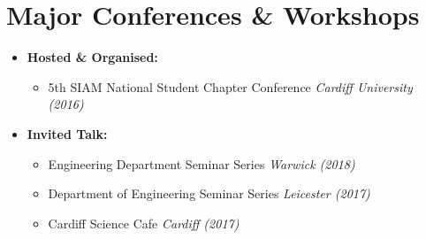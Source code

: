 \documentclass[10pt,a4paper,sans]{moderncv}        %
\begin{document}
	\vspace{10pt}
	
	\section{Major Conferences \& Workshops}
	
	\vspace{8pt}
	
	\begin{itemize}
		
		\item{\textbf{Hosted \& Organised:} 
			\small{
				\begin{itemize}
					\vspace{3pt}
					\item 5th SIAM National Student Chapter Conference \hfill \textit{Cardiff University (2016)}
		\end{itemize}}}
		
		\vspace{6pt}
		
		\item{\textbf{Invited Talk:}
			
			\small{
				\begin{itemize}
					\vspace{3pt}
					\item Engineering Department Seminar Series \hfill \textit{Warwick (2018)}
					\vspace{3pt}
					\item Department of Engineering Seminar Series \hfill \textit{Leicester (2017)}
					\vspace{3pt}
					\item Cardiff Science Cafe \hfill \textit{Cardiff (2017)}
		\end{itemize}}}
		
		\vspace{6pt}
		

\end{itemize}
\end{document}

